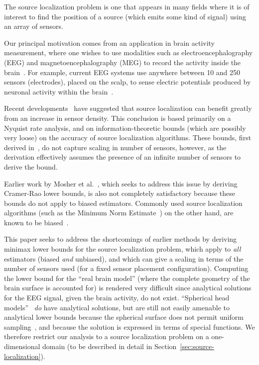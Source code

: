 \documentclass[conference]{IEEEtran}
\begin{document}

The source localization problem is one that appears in many fields where it is
of interest to find the position of a source (which emits some kind of signal)
using an array of sensors.

Our principal motivation comes from an application in brain activity
measurement, where one wishes to use modalities such as electroencephalography
(EEG) and magnetoencephalography (MEG) to record the activity inside the
brain~\cite{Baillet2001Electromagnetic}.  For example, current EEG systems use
anywhere between 10 and 250 sensors (electrodes), placed on the scalp, to sense
electric potentials produced by neuronal activity within the
brain~\cite{Nunez2006Electric}.

Recent developments~\cite{Grover2016Information} have suggested that source
localization can benefit greatly from an increase in sensor density. This
conclusion is based primarily on a Nyquist rate analysis, and on
information-theoretic bounds (which are possibly very loose) on the accuracy of
source localization algorithms. These bounds, first derived
in~\cite{Grover2016Fundamental}, do not capture scaling in number of sensors,
however, as the derivation effectively assumes the presence of an infinite
number of sensors to derive the bound.

Earlier work by Mosher et al.~\cite{Mosher1993Error}, which seeks to address
this issue by deriving Cramer-Rao lower bounds, is also not completely
satisfactory because these bounds do not apply to biased estimators. Commonly
used source localization algorithms (such as the Minimum Norm
Estimate~\cite{Hamalainen1994Interpreting}) on the other hand, are known to be
biased~\cite{Lin2006Assessing}.

This paper seeks to address the shortcomings of earlier methods by deriving
minimax lower bounds for the source localization problem, which apply to
\emph{all} estimators (biased \emph{and} unbiased), and which can give a
scaling in terms of the number of sensors used (for a fixed sensor placement
configuration). Computing the lower bound for the ``real brain model'' (where
the complete geometry of the brain surface is accounted for) is rendered very
difficult since analytical solutions for the EEG signal, given the brain
activity, do not exist. ``Spherical head
models''~\cite{Nunez2006Electric,Grover2016Information} \emph{do} have
analytical solutions, but are still not easily amenable to analytical lower
bounds because the spherical surface does not permit uniform
sampling~\cite{Heath1956Thirteen}, and because the solution is expressed in
terms of special functions. We therefore restrict our analysis to a source
localization problem on a one-dimensional domain (to be described in detail in
Section~\ref{sec:source-localization}).
\end{document}
